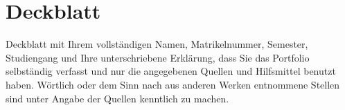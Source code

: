 \section{Deckblatt}
Deckblatt mit Ihrem vollständigen Namen, Matrikelnummer, Semester, Studiengang und Ihre unterschriebene Erklärung, dass Sie das Portfolio selbständig verfasst und nur die angegebenen Quellen und Hilfsmittel benutzt haben. Wörtlich oder dem Sinn nach aus anderen Werken entnommene Stellen sind unter Angabe der Quellen kenntlich zu machen.